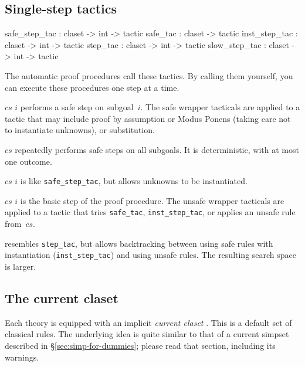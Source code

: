 \subsection{Single-step tactics}
\begin{ttbox} 
safe_step_tac : claset -> int -> tactic
safe_tac      : claset        -> tactic
inst_step_tac : claset -> int -> tactic
step_tac      : claset -> int -> tactic
slow_step_tac : claset -> int -> tactic
\end{ttbox}
The automatic proof procedures call these tactics.  By calling them
yourself, you can execute these procedures one step at a time.
\begin{ttdescription}
\item[\ttindexbold{safe_step_tac} $cs$ $i$] performs a safe step on
  subgoal~$i$.  The safe wrapper tacticals are applied to a tactic that may
  include proof by assumption or Modus Ponens (taking care not to instantiate
  unknowns), or substitution.

\item[\ttindexbold{safe_tac} $cs$] repeatedly performs safe steps on all 
subgoals.  It is deterministic, with at most one outcome.  

\item[\ttindexbold{inst_step_tac} $cs$ $i$] is like \texttt{safe_step_tac},
but allows unknowns to be instantiated.

\item[\ttindexbold{step_tac} $cs$ $i$] is the basic step of the proof
  procedure.  The unsafe wrapper tacticals are applied to a tactic that tries
  \texttt{safe_tac}, \texttt{inst_step_tac}, or applies an unsafe rule
  from~$cs$.

\item[\ttindexbold{slow_step_tac}] 
  resembles \texttt{step_tac}, but allows backtracking between using safe
  rules with instantiation (\texttt{inst_step_tac}) and using unsafe rules.
  The resulting search space is larger.
\end{ttdescription}


\subsection{The current claset}\label{sec:current-claset}

Each theory is equipped with an implicit \emph{current claset}
.  This is a default set of classical
rules.  The underlying idea is quite similar to that of a current
simpset described in {\S}\ref{sec:simp-for-dummies}; please read that
section, including its warnings.  

